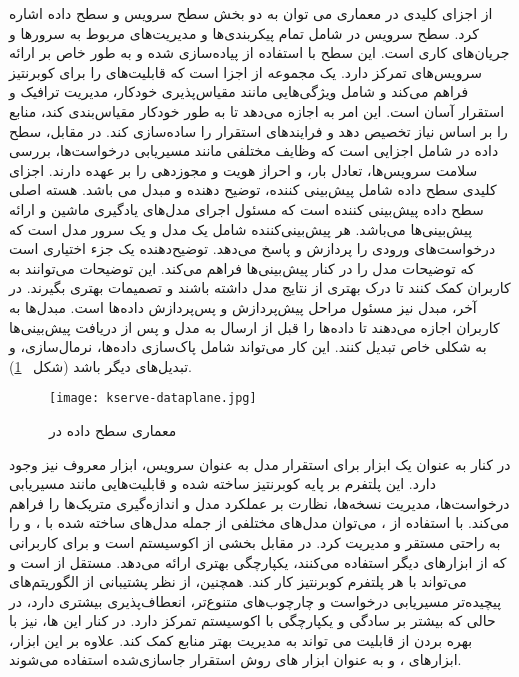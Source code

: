 از اجزای کلیدی در معماری  می توان به دو بخش سطح سرویس و سطح داده اشاره کرد. سطح سرویس در  شامل تمام پیکربندی‌ها و مدیریت‌های مربوط به سرورها و جریان‌های کاری است. این سطح با استفاده از  پیاده‌سازی شده و به طور خاص بر ارائه سرویس‌های  تمرکز دارد.  یک مجموعه از اجزا است که قابلیت‌های  را برای کوبرنتیز فراهم می‌کند و شامل ویژگی‌هایی مانند مقیاس‌پذیری خودکار، مدیریت ترافیک و استقرار آسان است. این امر به  اجازه می‌دهد تا به طور خودکار مقیاس‌بندی کند، منابع را بر اساس نیاز تخصیص دهد و فرایندهای استقرار را ساده‌سازی کند. در مقابل،‌ سطح داده در   شامل اجزایی است که وظایف مختلفی مانند مسیریابی درخواست‌ها، بررسی سلامت سرویس‌ها، تعادل بار، و احراز هویت و مجوزدهی را بر عهده دارند. اجزای کلیدی سطح داده شامل پیش‌بینی کننده،‌ توضیح دهنده و مبدل می باشد. هسته اصلی سطح داده پیش‌بینی کننده است که مسئول اجرای مدل‌های یادگیری ماشین و ارائه پیش‌بینی‌ها می‌باشد. هر پیش‌بینی‌کننده شامل یک مدل و یک سرور مدل است که درخواست‌های ورودی را پردازش و پاسخ می‌دهد. توضیح‌دهنده یک جزء اختیاری است که توضیحات مدل را در کنار پیش‌بینی‌ها فراهم می‌کند. این توضیحات می‌توانند به کاربران کمک کنند تا درک بهتری از نتایج مدل داشته باشند و تصمیمات بهتری بگیرند. در آخر،‌ مبدل نیز مسئول مراحل پیش‌پردازش و پس‌پردازش داده‌ها است. مبدل‌ها به کاربران اجازه می‌دهند تا داده‌ها را قبل از ارسال به مدل و پس از دریافت پیش‌بینی‌ها به شکلی خاص تبدیل کنند. این کار می‌تواند شامل پاک‌سازی داده‌ها، نرمال‌سازی، و تبدیل‌های دیگر باشد \cite{KServe} (شکل ~\ref{fig: kserve dataplane}). 

\begin{figure}[!t]
	\centering
	\texttt{[image: kserve-dataplane.jpg]}
	\caption{معماری سطح داده در }
	\label{fig: kserve dataplane}
\end{figure} 

در کنار  به عنوان یک ابزار برای استقرار مدل به عنوان سرویس،‌ ابزار معروف  نیز وجود دارد. این پلتفرم بر پایه کوبرنتیز ساخته شده و قابلیت‌هایی مانند مسیریابی درخواست‌ها، مدیریت نسخه‌ها، نظارت بر عملکرد مدل و اندازه‌گیری متریک‌ها را فراهم می‌کند. با استفاده از ، می‌توان مدل‌های مختلفی از جمله مدل‌های ساخته شده با ،  و  را به راحتی مستقر و مدیریت کرد. در مقابل  بخشی از اکوسیستم  است و برای کاربرانی که از ابزارهای دیگر  استفاده می‌کنند، یکپارچگی بهتری ارائه می‌دهد.  مستقل از  است و می‌تواند با هر پلتفرم کوبرنتیز کار کند. همچنین،  از نظر پشتیبانی از الگوریتم‌های پیچیده‌تر مسیریابی درخواست و چارچوب‌های متنوع‌تر، انعطاف‌پذیری بیشتری دارد، در حالی که  بیشتر بر سادگی و یکپارچگی با اکوسیستم  تمرکز دارد. در کنار این ها،  نیز با بهره بردن از قابلیت  می تواند به مدیریت بهتر منابع کمک کند. علاوه بر این ابزار، ابزارهای ،  و  به عنوان ابزار های روش استقرار جاسازی‌شده استفاده می‌شوند.

